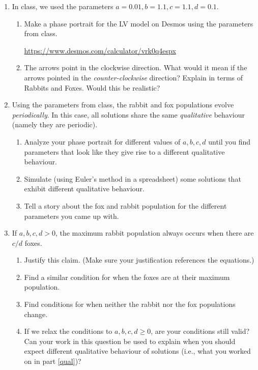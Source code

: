 \begin{enumerate}
	\item In class, we used the parameters $a=0.01, b=1.1, c=1.1, d=0.1$.

	\begin{enumerate}
		\item	Make a phase portrait for the LV model on Desmos 
			using the parameters from class.

		\url{https://www.desmos.com/calculator/vrk0q4espx}

		\item The arrows point in the clockwise direction. What would
			it mean if the arrows pointed in the
			\emph{counter-clockwise} direction? Explain in terms 
			of Rabbits and Foxes. Would this be realistic?
	\end{enumerate}

	\item\label{qual}
		Using the parameters from class, the rabbit and fox populations 
		evolve \emph{periodically}. In this case, all
		solutions share the same \emph{qualitative}
		behaviour (namely they are periodic).

		\begin{enumerate}
			\item Analyze your phase portrait for different values of $a,b,c,d$ until you
				find parameters that look like they give rise to a different
				qualitative behaviour.
			\item Simulate (using Euler's method in a spreadsheet) some
				solutions that exhibit different qualitative
				behaviour.
			\item Tell a story about the fox and rabbit population for
				the different parameters you came up with.
		\end{enumerate}
		
		\item If $a,b,c,d>0$, the maximum rabbit population always
			occurs when there are $c/d$ foxes.
		\begin{enumerate}
			\item Justify this claim. (Make sure your justification references the equations.)
			\item Find a similar condition for when the foxes are at their maximum population.
			\item Find conditions for when neither the rabbit nor the fox populations change.
			\item If we relax the conditions to $a,b,c,d\geq 0$, are your conditions still valid?
				Can your work in this question be used to explain when you should
				expect different qualitative behaviour of solutions (i.e., what
				you worked on in part \ref{qual})?
		\end{enumerate}


\end{enumerate}
